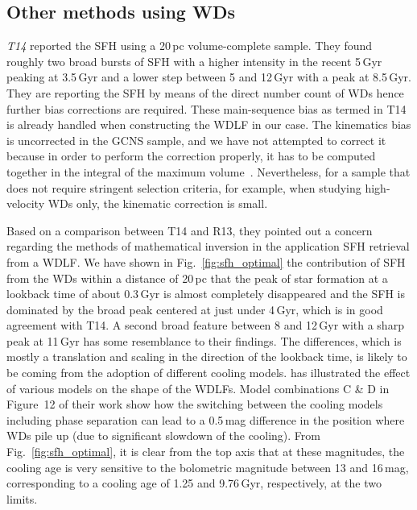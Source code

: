 \documentclass[fleqn,usenatbib]{mnras}
\begin{document}


\subsection{Other methods using WDs}
\textit{T14} reported the SFH using a 20\,pc volume-complete sample. They found roughly
two broad bursts of SFH with a higher intensity in the recent 5\,Gyr peaking at
3.5\,Gyr and a lower step between 5 and 12\,Gyr with a peak at 8.5\,Gyr. They
are reporting the SFH by means of the direct number count of WDs hence further
bias corrections are required. These main-sequence bias as termed in T14 
is already handled when constructing the WDLF in our case. The kinematics bias
is uncorrected in the GCNS sample, and we have not attempted to correct it
because in order to perform the correction properly, it has to be computed 
together in the integral of the maximum volume~\citep{2015MNRAS.450.4098L}.
Nevertheless, for a sample that does not require stringent selection
criteria, for example, when studying high-velocity WDs only, the
kinematic correction is small.

Based on a comparison between T14 and R13, they pointed out a concern regarding
the methods of mathematical inversion in the application SFH retrieval from a
WDLF. We have shown in Fig.~\ref{fig:sfh_optimal} the contribution of SFH
from the WDs within a distance of 20\,pc that the peak of star formation at a
lookback time of about 0.3\,Gyr is almost completely disappeared and the SFH is
dominated by the broad peak centered at just under 4\,Gyr, which is in good
agreement with T14. A second broad feature between 8 and 12\,Gyr with a sharp
peak at 11\,Gyr has some resemblance to their findings. The differences, which
is mostly a translation and scaling in the direction of the lookback time, is
likely to be coming from the adoption of different cooling models. 
\citet{2022RASTI...1...81L} has illustrated the effect of various models on 
the shape of the WDLFs. Model combinations C \& D in Figure~12 of their work show how the 
switching between the cooling models including phase separation can lead to
a 0.5\,mag difference in the position where WDs pile up (due to significant
slowdown of the cooling). From Fig.~\ref{fig:sfh_optimal}, it is clear from the
top axis that at these magnitudes, the cooling age is very sensitive to the
bolometric magnitude between 13 and 16\,mag, corresponding to a cooling age of
1.25 and 9.76\,Gyr, respectively, at the two limits.
\end{document}
